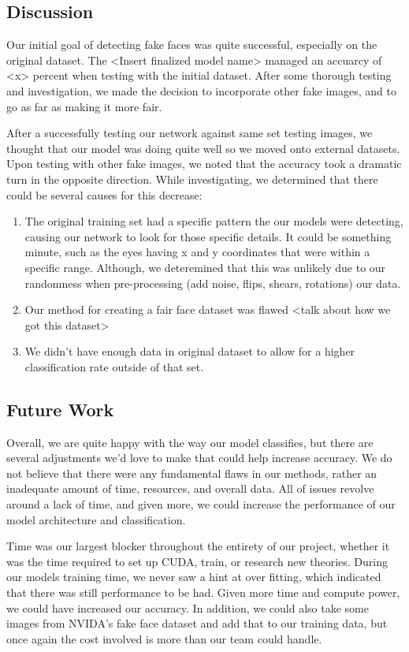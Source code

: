 \documentclass[11pt, letterpaper]{article}
\providecommand{\tightlist}{%
  \setlength{\itemsep}{0pt}\setlength{\parskip}{0pt}
}
\begin{document}
\begin{multicols}{2}
  \section{Discussion}
  Our initial goal of detecting fake faces was quite successful, especially on
  the original dataset. The <Insert finalized model name> managed an accuarcy of
  <x> percent when testing with the initial dataset. After some thorough testing
  and investigation, we made the decision to incorporate other fake images, and
  to go as far as making it more fair.

  After a successfully testing our network against same set testing images, we
  thought that our model was doing quite well so we moved onto external
  datasets. Upon testing with other fake images, we noted that the accuracy took
  a dramatic turn in the opposite direction. While investigating, we determined
  that there could be several causes for this decrease:

  \begin{enumerate}
    \tightlist
  		\item The original training set had a specific pattern the our models were
  		detecting, causing our network to look for those specific details. It
  		could be something minute, such as the eyes having x and y coordinates
  		that were within a specific range. Although, we deteremined that this was
  		unlikely due to our randomness when pre-processing (add noise, flips,
  		shears, rotations) our data.
  		\item Our method for creating a fair face dataset was flawed <talk about
  		how we got this dataset>
  		\item We didn't have enough data in original dataset to allow for a higher
  		classification rate outside of that set.
	\end{enumerate}

  \subsection{Future Work}
  Overall, we are quite happy with the way our model classifies, but there are
  several adjustments we'd love to make that could help increase accuracy. We do
  not believe that there were any fundamental flaws in our methods, rather an
  inadequate amount of time, resources, and overall data. All of issues revolve
  around a lack of time, and given more, we could increase the performance of
  our model architecture and classification.

  Time was our largest blocker throughout the entirety of our project, whether
  it was the time required to set up CUDA, train, or research new theories.
  During our models training time, we never saw a hint at over fitting, which
  indicated that there was still performance to be had. Given more time and
  compute power, we could have increased our accuracy. In addition, we could
  also take some images from NVIDA's fake face dataset and add that to our
  training data, but once again the cost involved is more than our team could
  handle.


\end{multicols}
\end{document}
